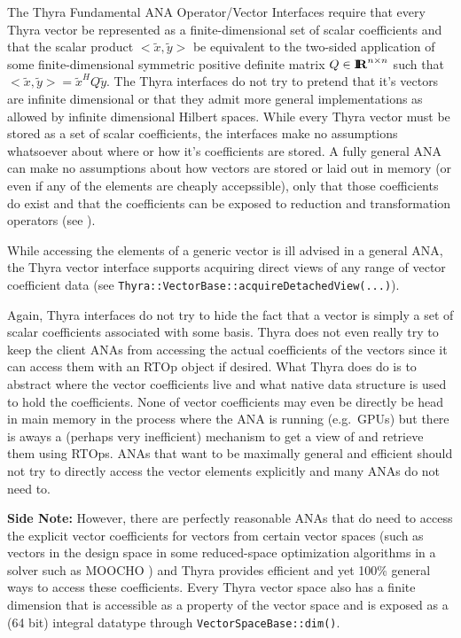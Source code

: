 \documentclass[11pt]{SANDreport}
\begin{document}
The Thyra Fundamental ANA Operator/Vector Interfaces require that every Thyra vector be represented as a finite-dimensional set of scalar coefficients and that the scalar product $<\tilde{x},\tilde{y}>$ be equivalent to the two-sided application of some finite-dimensional symmetric positive definite matrix $Q\in\mbox{\textbf{I}}\hspace{-0.6ex}\mbox{\textbf{R}}^{n\times{}n}$ such that $<\tilde{x},\tilde{y}> = \tilde{x}^H Q \tilde{y}$.  The Thyra interfaces do not try to pretend that it's vectors are infinite dimensional or that they admit more general implementations as allowed by infinite dimensional Hilbert spaces. While every Thyra vector must be stored as a set of scalar coefficients, the interfaces make no assumptions whatsoever about where or how it's coefficients are stored.  A fully general ANA can make no assumptions about how vectors are stored or laid out in memory (or even if any of the elements are cheaply accepssible), only that those coefficients do exist and that the coefficients can be exposed to reduction and transformation operators (see \cite{ref:rtop_toms}).

While accessing the elements of a generic vector is ill advised in a general ANA, the Thyra vector interface supports acquiring direct views of any range of vector coefficient data (see \texttt{Thyra::\-Vector\-Base\-::\-acquireDetachedView(...)}).

Again, Thyra interfaces do not try to hide the fact that a vector is simply a set of scalar coefficients associated with some basis.  Thyra does not even really try to keep the client ANAs from accessing the actual coefficients of the vectors since it can access them with an RTOp object if desired.  What Thyra does do is to abstract where the vector coefficients live and what native data structure is used to hold the coefficients.  None of vector coefficients may even be directly be head in main memory in the process where the ANA is running (e.g.\ GPUs) but there is aways a (perhaps very inefficient) mechanism to get a view of and retrieve them using RTOps.  ANAs that want to be maximally general and efficient should not try to directly access the vector elements explicitly and many ANAs do not need to.

\textbf{Side Note:} However, there are perfectly reasonable ANAs that do need to access the explicit vector coefficients for vectors from certain vector spaces (such as vectors in the design space in some reduced-space optimization algorithms in a solver such as MOOCHO \cite{MOOCHO}) and Thyra provides efficient and yet 100\% general ways to access these coefficients.  Every Thyra vector space also has a finite dimension that is accessible as a property of the vector space and is exposed as a (64 bit) integral datatype through \texttt{Vector\-Space\-Base\-::dim()}.
\end{document}
